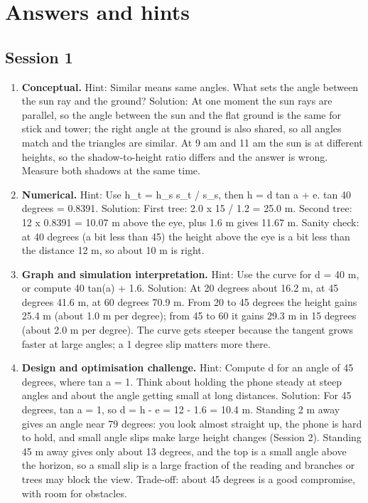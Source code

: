 \documentclass[11pt,a4paper]{article}
\begin{document}
\section{Answers and hints}

\subsection*{Session 1}
\begin{enumerate}[nosep]
\item \textbf{Conceptual.} Hint: Similar means same angles. What sets the angle between the sun ray and the ground? Solution: At one moment the sun rays are parallel, so the angle between the sun and the flat ground is the same for stick and tower; the right angle at the ground is also shared, so all angles match and the triangles are similar. At 9 am and 11 am the sun is at different heights, so the shadow-to-height ratio differs and the answer is wrong. Measure both shadows at the same time.
\item \textbf{Numerical.} Hint: Use h\_t = h\_s s\_t / s\_s, then h = d tan a + e. tan 40 degrees = 0.8391. Solution: First tree: 2.0 x 15 / 1.2 = 25.0 m. Second tree: 12 x 0.8391 = 10.07 m above the eye, plus 1.6 m gives 11.67 m. Sanity check: at 40 degrees (a bit less than 45) the height above the eye is a bit less than the distance 12 m, so about 10 m is right.
\item \textbf{Graph and simulation interpretation.} Hint: Use the curve for d = 40 m, or compute 40 tan(a) + 1.6. Solution: At 20 degrees about 16.2 m, at 45 degrees 41.6 m, at 60 degrees 70.9 m. From 20 to 45 degrees the height gains 25.4 m (about 1.0 m per degree); from 45 to 60 it gains 29.3 m in 15 degrees (about 2.0 m per degree). The curve gets steeper because the tangent grows faster at large angles; a 1 degree slip matters more there.
\item \textbf{Design and optimisation challenge.} Hint: Compute d for an angle of 45 degrees, where tan a = 1. Think about holding the phone steady at steep angles and about the angle getting small at long distances. Solution: For 45 degrees, tan a = 1, so d = h - e = 12 - 1.6 = 10.4 m. Standing 2 m away gives an angle near 79 degrees: you look almost straight up, the phone is hard to hold, and small angle slips make large height changes (Session 2). Standing 45 m away gives only about 13 degrees, and the top is a small angle above the horizon, so a small slip is a large fraction of the reading and branches or trees may block the view. Trade-off: about 45 degrees is a good compromise, with room for obstacles.
\end{enumerate}
\end{document}
